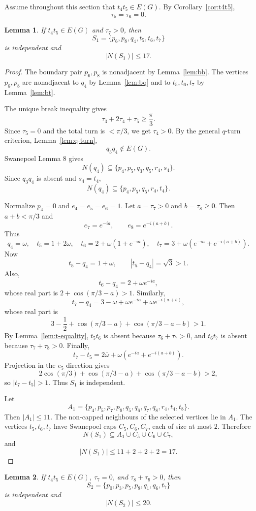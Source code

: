\documentclass[11pt]{article}
\theoremstyle{plain}
\newtheorem{lemma}{Lemma}
\numberwithin{equation}{section}
\begin{document}
Assume throughout this section that $t_4t_5\in E(G)$. By Corollary~\ref{cor:t4t5},
\[
 \tau_5=\tau_6=0.
\]

\begin{lemma}\label{lem:S1}
If $t_4t_5\in E(G)$ and $\tau_7>0$, then
\[
 S_1=\{p_6,p_8,q_4,t_5,t_6,t_7\}
\]
is independent and
\[
 |N(S_1)|\le17.
\]
\end{lemma}

\begin{proof}
The boundary pair $p_6,p_8$ is nonadjacent by Lemma~\ref{lem:bb}. The vertices $p_6,p_8$ are nonadjacent to $q_4$ by Lemma~\ref{lem:bq} and to $t_5,t_6,t_7$ by Lemma~\ref{lem:bt}.

The unique break inequality gives
\[
 \tau_3+2\tau_4+\tau_5\ge\frac{\pi}{3}.
\]
Since $\tau_5=0$ and the total turn is $<\pi/3$, we get $\tau_4>0$. By the general $q$-turn criterion, Lemma~\ref{lem:q-turn},
\[
 q_3q_4\notin E(G).
\]
Swanepoel Lemma 8 gives
\[
 N(q_4)\subseteq\{p_4,p_5,q_3,q_5,r_4,s_4\}.
\]
Since $q_3q_4$ is absent and $s_4=t_4$,
\[
 N(q_4)\subseteq\{p_4,p_5,q_5,r_4,t_4\}.
\]

Normalize $p_4=0$ and $e_4=e_5=e_6=1$. Let $a=\tau_7>0$ and $b=\tau_8\ge0$. Then $a+b<\pi/3$ and
\[
 e_7=e^{-ia},
 \qquad
 e_8=e^{-i(a+b)}.
\]
Thus
\[
 q_4=\omega,
 \quad
 t_5=1+2\omega,
 \quad
 t_6=2+\omega(1+e^{-ia}),
 \quad
 t_7=3+\omega(e^{-ia}+e^{-i(a+b)}).
\]
Now
\[
 t_5-q_4=1+\omega,
 \qquad |t_5-q_4|=\sqrt3>1.
\]
Also,
\[
 t_6-q_4=2+\omega e^{-ia},
\]
whose real part is $2+\cos(\pi/3-a)>1$. Similarly,
\[
 t_7-q_4=3-\omega+\omega e^{-ia}+\omega e^{-i(a+b)},
\]
whose real part is
\[
 3-\frac12+\cos(\pi/3-a)+\cos(\pi/3-a-b)>1.
\]
By Lemma~\ref{lem:t-equality}, $t_5t_6$ is absent because $\tau_6+\tau_7>0$, and $t_6t_7$ is absent because $\tau_7+\tau_8>0$.
Finally,
\[
 t_7-t_5=2\bar\omega+\omega(e^{-ia}+e^{-i(a+b)}).
\]
Projection in the $e_5$ direction gives
\[
2\cos(\pi/3)+\cos(\pi/3-a)+\cos(\pi/3-a-b)>2,
\]
so $|t_7-t_5|>1$. Thus $S_1$ is independent.

Let
\[
 A_1=\{p_4,p_5,p_7,p_9,q_5,q_6,q_7,q_8,r_4,t_4,t_8\}.
\]
Then $|A_1|\le11$. The non-capped neighbours of the selected vertices lie in $A_1$. The vertices $t_5,t_6,t_7$ have Swanepoel caps $C_5,C_6,C_7$, each of size at most $2$. Therefore
\[
 N(S_1)\subseteq A_1\cup C_5\cup C_6\cup C_7,
\]
and
\[
 |N(S_1)|\le11+2+2+2=17.
\]
\end{proof}

\begin{lemma}\label{lem:S2}
If $t_4t_5\in E(G)$, $\tau_7=0$, and $\tau_8+\tau_9>0$, then
\[
 S_2=\{p_0,p_3,p_5,p_8,q_1,q_6,t_7\}
\]
is independent and
\[
 |N(S_2)|\le20.
\]
\end{lemma}
\end{document}
